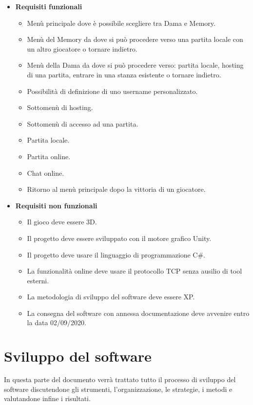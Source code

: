 \documentclass[12pt]{article}
\begin{document}
\begin{itemize}
\item \textbf{Requisiti funzionali}
\begin{itemize}
\item Menù principale dove è possibile scegliere tra Dama e Memory.
\item Menù del Memory da dove si può procedere verso una partita locale con un altro giocatore o tornare indietro.
\item Menù della Dama da dove si può procedere verso: partita locale, hosting di una partita, entrare in una stanza esistente o tornare indietro.
\item Possibilità di definizione di uno username personalizzato.
\item Sottomenù di hosting.
\item Sottomenù di accesso ad una partita.
\item Partita locale.
\item Partita online.
\item Chat online.
\item Ritorno al menù principale dopo la vittoria di un giocatore.
\end{itemize}
\item \textbf{Requisiti non funzionali}
\begin{itemize}
\item Il gioco deve essere 3D.
\item Il progetto deve essere sviluppato con il motore grafico Unity.
\item Il progetto deve usare il linguaggio di programmazione C\#.
\item La funzionalità online deve usare il protocollo TCP senza ausilio di tool esterni.
\item La metodologia di sviluppo del software deve essere XP.
\item La consegna del software con annessa documentazione deve avvenire entro la data 02/09/2020.
\end{itemize}
\end{itemize}


\section{Sviluppo del software}
In questa parte del documento verrà trattato tutto il processo di sviluppo del software discutendone gli strumenti, l'organizzazione, le strategie, i metodi e valutandone infine i risultati.
\end{document}
